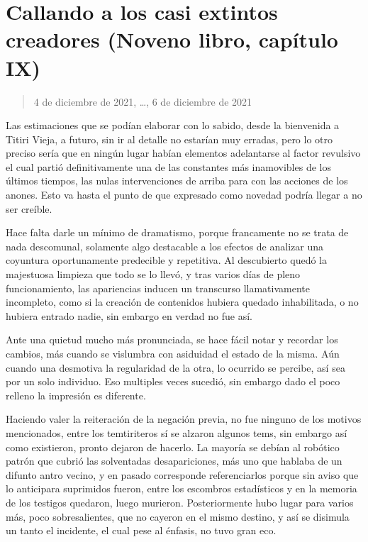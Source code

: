 \documentclass[
]{book}
\begin{document}
\hypertarget{callando-a-los-casi-extintos-creadores-noveno-libro-capuxedtulo-ix}{%
\section{Callando a los casi extintos creadores (Noveno libro, capítulo IX)}\label{callando-a-los-casi-extintos-creadores-noveno-libro-capuxedtulo-ix}}

\begin{quote}
4 de diciembre de 2021, \ldots, 6 de diciembre de 2021
\end{quote}

Las estimaciones que se podían elaborar con lo sabido, desde la bienvenida a Titiri Vieja, a futuro, sin ir al detalle no estarían muy erradas, pero lo otro preciso sería que en ningún lugar habían elementos adelantarse al factor revulsivo el cual partió definitivamente una de las constantes más inamovibles de los últimos tiempos, las nulas intervenciones de arriba para con las acciones de los anones. Esto va hasta el punto de que expresado como novedad podría llegar a no ser creíble.

Hace falta darle un mínimo de dramatismo, porque francamente no se trata de nada descomunal, solamente algo destacable a los efectos de analizar una coyuntura oportunamente predecible y repetitiva. Al descubierto quedó la majestuosa limpieza que todo se lo llevó, y tras varios días de pleno funcionamiento, las apariencias inducen un transcurso llamativamente incompleto, como si la creación de contenidos hubiera quedado inhabilitada, o no hubiera entrado nadie, sin embargo en verdad no fue así.

Ante una quietud mucho más pronunciada, se hace fácil notar y recordar los cambios, más cuando se vislumbra con asiduidad el estado de la misma. Aún cuando una desmotiva la regularidad de la otra, lo ocurrido se percibe, así sea por un solo individuo. Eso multiples veces sucedió, sin embargo dado el poco relleno la impresión es diferente.

Haciendo valer la reiteración de la negación previa, no fue ninguno de los motivos mencionados, entre los temtiriteros sí se alzaron algunos tems, sin embargo así como existieron, pronto dejaron de hacerlo. La mayoría se debían al robótico patrón que cubrió las solventadas desapariciones, más uno que hablaba de un difunto antro vecino, y en pasado corresponde referenciarlos porque sin aviso que lo anticipara suprimidos fueron, entre los escombros estadísticos y en la memoria de los testigos quedaron, luego murieron. Posteriormente hubo lugar para varios más, poco sobresalientes, que no cayeron en el mismo destino, y así se disimula un tanto el incidente, el cual pese al énfasis, no tuvo gran eco.
\end{document}
